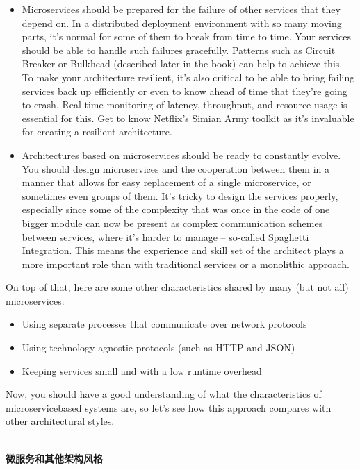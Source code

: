 \begin{itemize}
\item
Microservices should be prepared for the failure of other services that they depend on. In a distributed deployment environment with so many moving parts, it's normal for some of them to break from time to time. Your services should be able to handle such failures gracefully. Patterns such as Circuit Breaker or Bulkhead (described later in the book) can help to achieve this. To make your architecture resilient, it's also critical to be able to bring failing services back up efficiently or even to know ahead of time that they're going to crash. Real-time monitoring of latency, throughput, and resource usage is essential for this. Get to know Netflix's Simian Army toolkit as it's invaluable for creating a resilient architecture.

\item
Architectures based on microservices should be ready to constantly evolve. You should design microservices and the cooperation between them in a manner that allows for easy replacement of a single microservice, or sometimes even groups of them. It's tricky to design the services properly, especially since some of the complexity that was once in the code of one bigger module can now be present as complex communication schemes between services, where it's harder to manage – so-called Spaghetti Integration. This means the experience and skill set of the architect plays a more important role than with traditional services or a monolithic approach.


\end{itemize}

On top of that, here are some other characteristics shared by many (but not all) microservices:

\begin{itemize}
\item	
Using separate processes that communicate over network protocols
	
\item
Using technology-agnostic protocols (such as HTTP and JSON)

\item
Keeping services small and with a low runtime overhead
\end{itemize}

Now, you should have a good understanding of what the characteristics of microservicebased systems are, so let's see how this approach compares with other architectural styles.

\hspace*{\fill} \\ %
\noindent
\textbf{微服务和其他架构风格}

